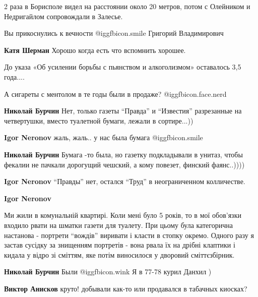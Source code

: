 \begin{itemize}
\begin{itemize}
\end{itemize} %


2 раза в Борисполе видел на расстоянии около 20 метров, потом с Олейником и
Недригайлом сопровождали в Залесье.

\begin{itemize} %
Вы прикоснулись к вечности  @igg{fbicon.smile}  Григорий Владимирович

\textbf{Катя Шерман} Хорошо когда есть что вспомнить хорошее.
\end{itemize} %

До указа «Об усилении борьбы с пьянством и алкоголизмом» оставалось 3,5 года....

А сигареты с ментолом в те годы были в продаже? @igg{fbicon.face.nerd} 

\begin{itemize} %
\textbf{Николай Бурчин} Нет, только газеты \enquote{Правда} и
\enquote{Известия} разрезанные на четвертушки, вместо туалетной бумаги, лежали
в сортире...))

\begin{itemize} %
\textbf{Igor Neronov} жаль, жаль.. у нас была бумага  @igg{fbicon.smile} 

\textbf{Николай Бурчин} Бумага -то была, но газетку подкладывали в унитаз, чтобы фекалии не пачкали дорогущий чешский, а кому повезет, финский фаянс..))))

\textbf{Igor Neronov} \enquote{Правды} нет, остался \enquote{Труд} в неограниченном колличестве.

\textbf{Igor Neronov} 

Ми жили в комунальній квартирі. Коли мені було 5 років, то в мої обов'язки
входило рвати на шматки газети для туалету. При цьому була категорична
настанова - портрети \enquote{вождів} виривати і класти в стопку окремо. Одного разу я
застав сусідку за знищенням портретів - вона рвала їх на дрібні клаптики і
кидала у відро зі сміттям, яке потім виносилося у дворовий сміттєзбірник.

\end{itemize} %

\textbf{Николай Бурчин}
Были  @igg{fbicon.wink}  Я в 77-78 курил Данхил )

\begin{itemize} %
\textbf{Виктор Анисков} круто! добывали как-то или продавался в табачных киосках?


\end{itemize}
\end{itemize}
\end{itemize}
